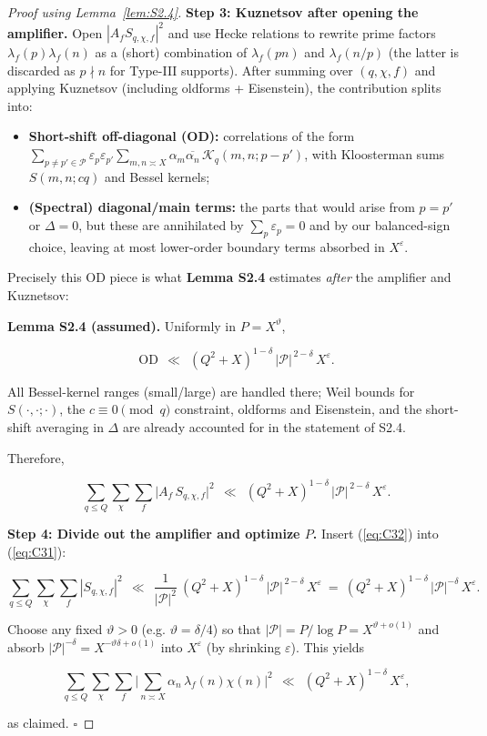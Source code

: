 \documentclass[11pt]{article}
\def\eqref#1{(\ref{#1})}%
\theoremstyle{definition}
\theoremstyle{remark}
\numberwithin{equation}{part}
\begin{document}
\begin{proof}[Proof using Lemma~\ref{lem:S2.4}]
	\noindent\textbf{Step 3: Kuznetsov after opening the amplifier.}
	Open $|A_f S_{q,\chi,f}|^2$ and use Hecke relations to rewrite prime factors $\lambda_f(p)\lambda_f(n)$ as a (short) combination of $\lambda_f(pn)$ and $\lambda_f(n/p)$ (the latter is discarded as $p\nmid n$ for Type-III supports). After summing over $(q,\chi,f)$ and applying Kuznetsov (including oldforms + Eisenstein), the contribution splits into:

	\begin{itemize}
		\item \textbf{Short-shift off-diagonal (OD):} correlations of the form
		      $\sum_{p\neq p'\in\mathcal P}\varepsilon_p\varepsilon_{p'}\sum_{m,n\asymp X}\alpha_m\overline{\alpha_n}\, \mathcal{K}_{q}(m, n; p-p')$,
		      with Kloosterman sums $S(m,n;cq)$ and Bessel kernels;
		\item \textbf{(Spectral) diagonal/main terms:} the parts that would arise from $p=p'$ or $\Delta=0$, but these are annihilated by $\sum_p\varepsilon_p=0$ and by our balanced-sign choice, leaving at most lower-order boundary terms absorbed in $X^{\varepsilon}$.
	\end{itemize}

	Precisely this OD piece is what \textbf{Lemma S2.4} estimates \emph{after} the amplifier and Kuznetsov:

	\noindent\textbf{Lemma S2.4 (assumed).} Uniformly in $P=X^\vartheta$,

	$$
		\mathrm{OD}\ \ \ll\ \ (Q^2+X)^{1-\delta}\,|\mathcal P|^{\,2-\delta}\,X^{\varepsilon}.
	$$

	All Bessel-kernel ranges (small/large) are handled there; Weil bounds for $S(\cdot,\cdot;\cdot)$, the $c\equiv0\pmod q$ constraint, oldforms and Eisenstein, and the short-shift averaging in $\Delta$ are already accounted for in the statement of S2.4.

	Therefore,

	\begin{equation}\label{eq:C32}
		\sum_{q\le Q}\sum_{\chi}\sum_f \big|A_f\,S_{q,\chi,f}\big|^2
		\ \ \ll\ \ (Q^2+X)^{1-\delta}\,|\mathcal P|^{\,2-\delta}\,X^{\varepsilon}.
	\end{equation}


	\noindent\textbf{Step 4: Divide out the amplifier and optimize $P$.}
	Insert \eqref{eq:C32} into \eqref{eq:C31}:

	$$
		\sum_{q\le Q}\sum_{\chi}\sum_f |S_{q,\chi,f}|^2
		\ \ \ll\ \ \frac{1}{|\mathcal P|^2}\ (Q^2+X)^{1-\delta}\,|\mathcal P|^{\,2-\delta}\,X^{\varepsilon}
		\ =\ (Q^2+X)^{1-\delta}\,|\mathcal P|^{-\delta}\,X^{\varepsilon}.
	$$

	Choose any fixed $\vartheta>0$ (e.g. $\vartheta=\delta/4$) so that $|\mathcal P|=P/\log P=X^{\vartheta+o(1)}$ and absorb $|\mathcal P|^{-\delta}=X^{-\vartheta\delta+o(1)}$ into $X^{\varepsilon}$ (by shrinking $\varepsilon$). This yields

	$$
		\sum_{q\le Q}\sum_{\chi}\sum_f \Big|\sum_{n\asymp X}\alpha_n\,\lambda_f(n)\chi(n)\Big|^2
		\ \ \ll\ \ (Q^2+X)^{1-\delta}\,X^{\varepsilon},
	$$

	as claimed. $\square$

\end{proof}
\end{document}
